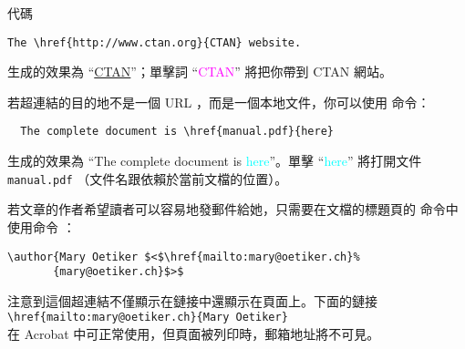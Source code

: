 代碼
\begin{code}
\begin{verbatim}
The \href{http://www.ctan.org}{CTAN} website.
\end{verbatim}
\end{code}
生成的效果為 ``\href{http://www.ctan.org}{CTAN}''；單擊詞 ``\textcolor{magenta}{CTAN}'' 將把你帶到 CTAN 網站。


若超連結的目的地不是一個 URL ，而是一個本地文件，你可以使用  命令：
\begin{verbatim}
  The complete document is \href{manual.pdf}{here}
\end{verbatim}
生成的效果為 ``The complete document is
\textcolor{cyan}{here}''。單擊 ``\textcolor{cyan}{here}'' 將打開文件 \texttt{manual.pdf}
（文件名跟依賴於當前文檔的位置）。


若文章的作者希望讀者可以容易地發郵件給她，只需要在文檔的標題頁的  命令中使用命令
 ：
\begin{code}
\begin{verbatim}
\author{Mary Oetiker $<$\href{mailto:mary@oetiker.ch}%
       {mary@oetiker.ch}$>$
\end{verbatim}
\end{code}
注意到這個超連結不僅顯示在鏈接中還顯示在頁面上。下面的鏈接\\
\verb+\href{mailto:mary@oetiker.ch}{Mary Oetiker}+ \\
在 Acrobat 中可正常使用，但頁面被列印時，郵箱地址將不可見。


